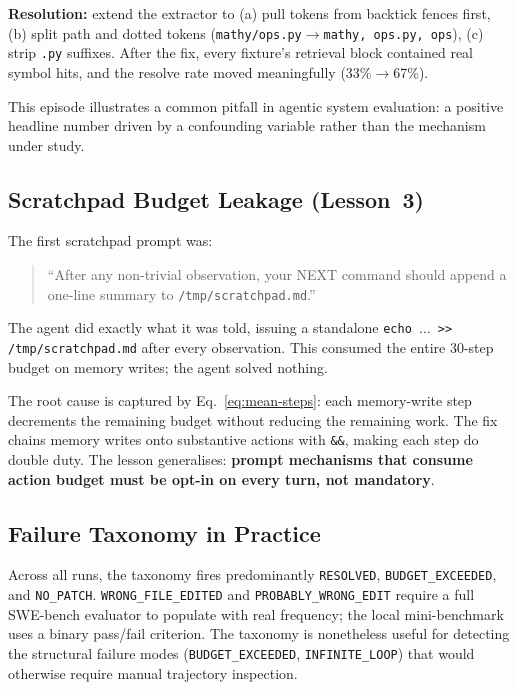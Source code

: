 \documentclass[11pt]{article}
\begin{document}
\textbf{Resolution:} extend the extractor to (a) pull tokens from backtick
fences first, (b) split path and dotted tokens
(\texttt{mathy/ops.py}$\to$\texttt{mathy, ops.py, ops}), (c) strip
\texttt{.py} suffixes.  After the fix, every fixture's retrieval block
contained real symbol hits, and the resolve rate moved meaningfully
(33\%$\to$67\%).

This episode illustrates a common pitfall in agentic system evaluation:
a positive headline number driven by a confounding variable rather than the
mechanism under study.

\subsection{Scratchpad Budget Leakage (Lesson~3)}
\label{sec:scratchpad}

The first scratchpad prompt was:
\begin{quote}\small
``After any non-trivial observation, your NEXT command should append a
one-line summary to \texttt{/tmp/scratchpad.md}.''
\end{quote}
The agent did exactly what it was told, issuing a standalone
\texttt{echo $\ldots$ >> /tmp/scratchpad.md} after every observation.  This
consumed the entire 30-step budget on memory writes; the agent solved nothing.

The root cause is captured by Eq.~\eqref{eq:mean-steps}: each memory-write step
decrements the remaining budget without reducing the remaining work.  The fix
chains memory writes onto substantive actions with \texttt{\&\&}, making each
step do double duty.  The lesson generalises: \textbf{prompt mechanisms that
consume action budget must be opt-in on every turn, not mandatory}.

\subsection{Failure Taxonomy in Practice}
\label{sec:taxonomy-practice}

Across all runs, the taxonomy fires predominantly
\texttt{RESOLVED}, \texttt{BUDGET\_EXCEEDED}, and \texttt{NO\_PATCH}.
\texttt{WRONG\_FILE\_EDITED} and \texttt{PROBABLY\_WRONG\_EDIT} require a
full SWE-bench evaluator to populate with real frequency; the local
mini-benchmark uses a binary pass/fail criterion.  The taxonomy is nonetheless
useful for detecting the structural failure modes
(\texttt{BUDGET\_EXCEEDED}, \texttt{INFINITE\_LOOP}) that would otherwise
require manual trajectory inspection.
\end{document}
